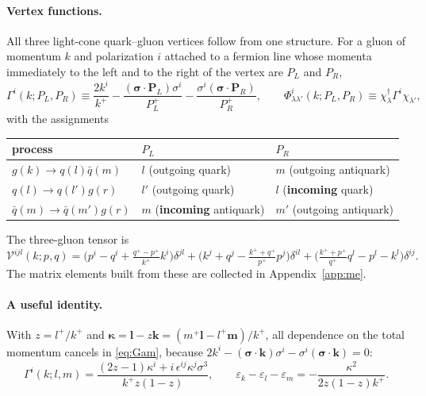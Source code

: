 \documentclass[11pt]{article}
\newcommand{\eps}{\varepsilon}
\newcommand{\dg}{\dagger}
\newcommand{\Gam}{\Gamma}
\newcommand{\Ph}{\Phi}
\newcommand{\Vg}{\mathcal{V}}
\begin{document}
\paragraph{Vertex functions.} All three light-cone quark--gluon vertices follow from one
structure. For a gluon of momentum $k$ and polarization $i$ attached to a fermion line whose
momenta immediately to the left and to the right of the vertex are $P_{L}$ and $P_{R}$,
\begin{equation}
\Gam^{i}(k;P_{L},P_{R})\equiv\frac{2k^{i}}{k^{+}}
-\frac{(\bm\sigma\!\cdot\!\bm P_{L})\sigma^{i}}{P_{L}^{+}}
-\frac{\sigma^{i}(\bm\sigma\!\cdot\!\bm P_{R})}{P_{R}^{+}},
\qquad
\Ph^{i}_{\lambda\lambda'}(k;P_{L},P_{R})\equiv\chi^{\dg}_{\lambda}\Gam^{i}\chi_{\lambda'},
\label{eq:Gam}
\end{equation}
with the assignments
\begin{center}
\begin{tabular}{lll}
\hline
process & $P_{L}$ & $P_{R}$\\\hline
$g(k)\to q(l)\bar q(m)$ & $l$ (outgoing quark) & $m$ (outgoing antiquark)\\
$q(l)\to q(l')g(r)$ & $l'$ (outgoing quark) & $l$ (\textbf{incoming} quark)\\
$\bar q(m)\to\bar q(m')g(r)$ & $m$ (\textbf{incoming} antiquark) & $m'$ (outgoing antiquark)\\
\hline
\end{tabular}
\end{center}
The three-gluon tensor is
\begin{equation}
\Vg^{ijl}(k;p,q)=\Big(p^{i}-q^{i}+\tfrac{q^{+}-p^{+}}{k^{+}}k^{i}\Big)\delta^{jl}
+\Big(k^{j}+q^{j}-\tfrac{k^{+}+q^{+}}{p^{+}}p^{j}\Big)\delta^{il}
+\Big(\tfrac{k^{+}+p^{+}}{q^{+}}q^{l}-p^{l}-k^{l}\Big)\delta^{ij}.
\label{eq:Vggg}
\end{equation}
The matrix elements built from these are collected in Appendix~\ref{app:me}.

\paragraph{A useful identity.} With $z=l^{+}/k^{+}$ and
$\bm\kappa=\bm l-z\bm k=(m^{+}\bm l-l^{+}\bm m)/k^{+}$, all dependence on the total momentum
cancels in \eqref{eq:Gam}, because
$2k^{i}-(\bm\sigma\!\cdot\!\bm k)\sigma^{i}-\sigma^{i}(\bm\sigma\!\cdot\!\bm k)=0$:
\begin{equation}
\Gam^{i}(k;l,m)=\frac{(2z-1)\kappa^{i}+i\,\epsilon^{ij}\kappa^{j}\sigma^{3}}{k^{+}z(1-z)},
\qquad
\eps_{k}-\eps_{l}-\eps_{m}=-\frac{\kappa^{2}}{2z(1-z)k^{+}} .
\label{eq:kappa}
\end{equation}
\end{document}

